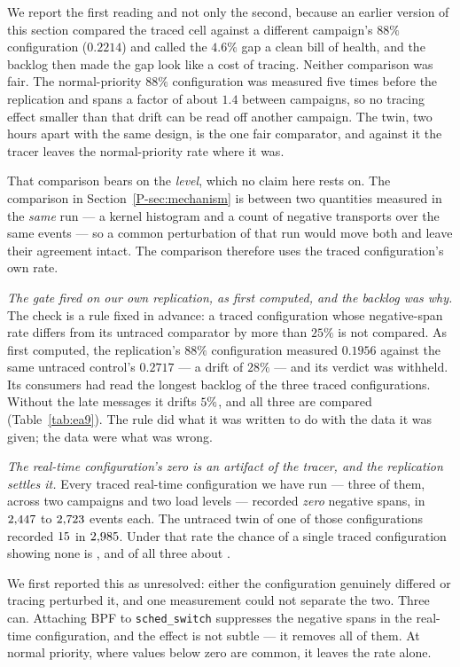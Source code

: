 \documentclass[10pt,journal,onecolumn]{IEEEtran}
\newcommand{\mainModeA}{\ref{P-sec:mechanism}}             %
\begin{document}
We report the first reading and not only the second, because an earlier version of this section
compared the traced cell against a different campaign's $88\%$ configuration ($0.2214$) and called the
$4.6\%$ gap a clean bill of health, and the backlog then made the gap look like a cost of tracing.
Neither comparison was fair. The normal-priority $88\%$ configuration was measured five times
before the replication and spans a factor of about $1.4$ between campaigns, so no tracing effect
smaller than that drift can be read off another campaign. The twin, two hours apart with the same
design, is the one fair comparator, and against it the tracer leaves the normal-priority rate where
it was.

That comparison bears on the \emph{level}, which no claim here rests on. The comparison in Section~\mainModeA{} is between two quantities measured in the \emph{same} run --- a kernel
histogram and a count of negative transports over the same events --- so a common perturbation of
that run would move both and leave their agreement intact. The comparison therefore uses the
traced configuration's own rate.

\emph{The gate fired on our own replication, as first computed, and the backlog was why.} The check is a
rule fixed in advance: a traced configuration whose negative-span rate differs from its untraced comparator by
more than $25\%$ is not compared. As first computed, the replication's $88\%$ configuration measured
$0.1956$ against the same untraced control's $0.2717$ --- a drift of $28\%$ --- and its verdict was
withheld. Its consumers had read the longest backlog of the three traced configurations. Without the
late messages it drifts $5\%$, and all three are compared
(Table~\ref{tab:ea9}). The rule did what it was written to do with the data it was given; the data
were what was wrong.

\emph{The real-time configuration's zero is an artifact of the tracer, and the replication settles
it.} Every traced real-time configuration we have run --- three of them, across two campaigns and two load
levels --- recorded \emph{zero} negative spans, in $2{,}447$ to $2{,}723$ events
each. The untraced twin of one of those configurations recorded $15$ in
$2{,}985$. Under that rate the chance of a single traced configuration showing none is
\tracedZeroChanceOne, and of all three about \tracedZeroChanceAll.

We first reported this as unresolved: either the configuration genuinely differed or tracing perturbed it,
and one measurement could not separate the two. Three can. Attaching BPF to
\texttt{sched\_switch} suppresses the negative spans in the real-time configuration, and the effect is not
subtle --- it removes all of them. At normal priority, where values below zero are common, it
leaves the rate alone.
\end{document}
